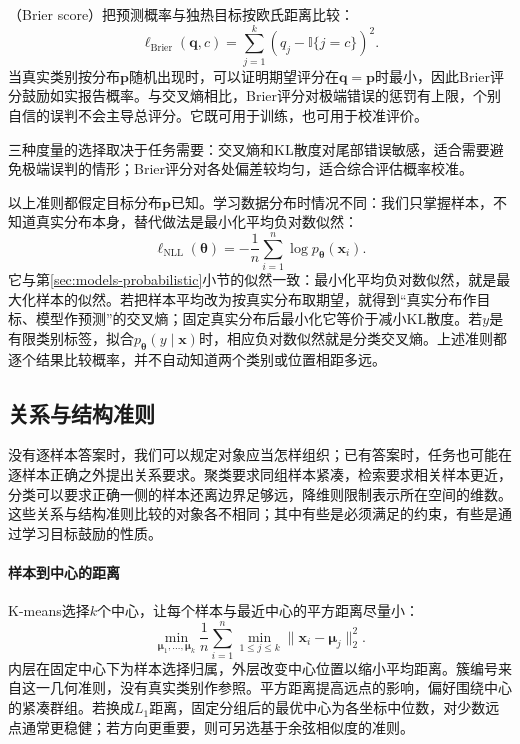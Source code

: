 （Brier score）把预测概率与独热目标按欧氏距离比较：
\begin{equation}
  \ell_{\mathrm{Brier}}(\bm{q},c)
  =\sum_{j=1}^{k}(q_j-\mathbb{I}\{j=c\})^2.
  \label{eq:models-brier}
\end{equation}
当真实类别按分布$\bm{p}$随机出现时，可以证明期望评分在$\bm{q}=\bm{p}$时最小，因此Brier评分鼓励如实报告概率。与交叉熵相比，Brier评分对极端错误的惩罚有上限，个别自信的误判不会主导总评分。它既可用于训练，也可用于校准评价。

三种度量的选择取决于任务需要：交叉熵和KL散度对尾部错误敏感，适合需要避免极端误判的情形；Brier评分对各处偏差较均匀，适合综合评估概率校准。

以上准则都假定目标分布$\bm{p}$已知。学习数据分布时情况不同：我们只掌握样本，不知道真实分布本身，替代做法是最小化平均负对数似然：
\begin{equation}
  \ell_{\mathrm{NLL}}(\bm{\theta})
  =-\frac{1}{n}\sum_{i=1}^{n}\log p_{\bm{\theta}}(\bm{x}_i).
  \label{eq:models-negative-log-likelihood}
\end{equation}
它与第\ref{sec:models-probabilistic}小节的似然一致：最小化平均负对数似然，就是最大化样本的似然。若把样本平均改为按真实分布取期望，就得到“真实分布作目标、模型作预测”的交叉熵；固定真实分布后最小化它等价于减小KL散度。若$y$是有限类别标签，拟合$p_{\bm{\theta}}(y\mid\bm{x})$时，相应负对数似然就是分类交叉熵。上述准则都逐个结果比较概率，并不自动知道两个类别或位置相距多远。

\subsection{关系与结构准则}
\label{sec:models-spatial-objectives}

没有逐样本答案时，我们可以规定对象应当怎样组织；已有答案时，任务也可能在逐样本正确之外提出关系要求。聚类要求同组样本紧凑，检索要求相关样本更近，分类可以要求正确一侧的样本还离边界足够远，降维则限制表示所在空间的维数。这些关系与结构准则比较的对象各不相同；其中有些是必须满足的约束，有些是通过学习目标鼓励的性质。

\paragraph{样本到中心的距离}

K-means选择$k$个中心，让每个样本与最近中心的平方距离尽量小：
\begin{equation}
  \min_{\bm{\mu}_1,\ldots,\bm{\mu}_k}
  \frac{1}{n}\sum_{i=1}^{n}\min_{1\leq j\leq k}
  \lVert\bm{x}_i-\bm{\mu}_j\rVert_2^2.
  \label{eq:models-kmeans-objective}
\end{equation}
内层在固定中心下为样本选择归属，外层改变中心位置以缩小平均距离。簇编号来自这一几何准则，没有真实类别作参照。平方距离提高远点的影响，偏好围绕中心的紧凑群组。若换成$L_1$距离，固定分组后的最优中心为各坐标中位数，对少数远点通常更稳健；若方向更重要，则可另选基于余弦相似度的准则。

